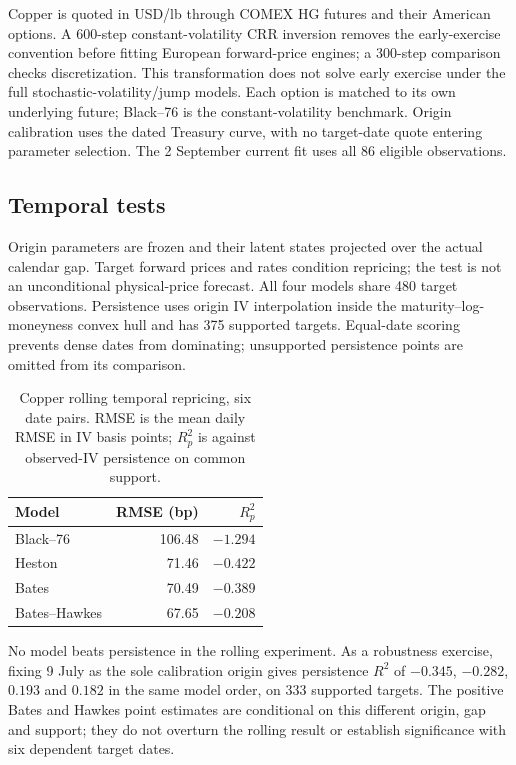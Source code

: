 Copper is quoted in USD/lb through COMEX HG futures and their American options. A 600-step constant-volatility CRR inversion removes the early-exercise convention before fitting European forward-price engines; a 300-step comparison checks discretization. This transformation does not solve early exercise under the full stochastic-volatility/jump models. Each option is matched to its own underlying future; Black--76 is the constant-volatility benchmark. Origin calibration uses the dated Treasury curve, with no target-date quote entering parameter selection. The 2 September current fit uses all 86 eligible observations.

\subsection{Temporal tests}
Origin parameters are frozen and their latent states projected over the actual calendar gap. Target forward prices and rates condition repricing; the test is not an unconditional physical-price forecast. All four models share 480 target observations. Persistence uses origin IV interpolation inside the maturity--log-moneyness convex hull and has 375 supported targets. Equal-date scoring prevents dense dates from dominating; unsupported persistence points are omitted from its comparison.

\begin{table}[H]
\centering
\caption{Copper rolling temporal repricing, six date pairs. RMSE is the mean daily RMSE in IV basis points; $R^2_p$ is against observed-IV persistence on common support.}
\begin{tabular}{@{}lrr@{}}
\toprule
Model & RMSE (bp) & $R^2_p$ \\
\midrule
Black--76 & 106.48 & $-1.294$ \\
Heston & 71.46 & $-0.422$ \\
Bates & 70.49 & $-0.389$ \\
Bates--Hawkes & 67.65 & $-0.208$ \\
\bottomrule
\end{tabular}
\label{tab:copper-oos}
\end{table}

No model beats persistence in the rolling experiment. As a robustness exercise, fixing 9 July as the sole calibration origin gives persistence $R^2$ of $-0.345$, $-0.282$, $0.193$ and $0.182$ in the same model order, on 333 supported targets. The positive Bates and Hawkes point estimates are conditional on this different origin, gap and support; they do not overturn the rolling result or establish significance with six dependent target dates.

